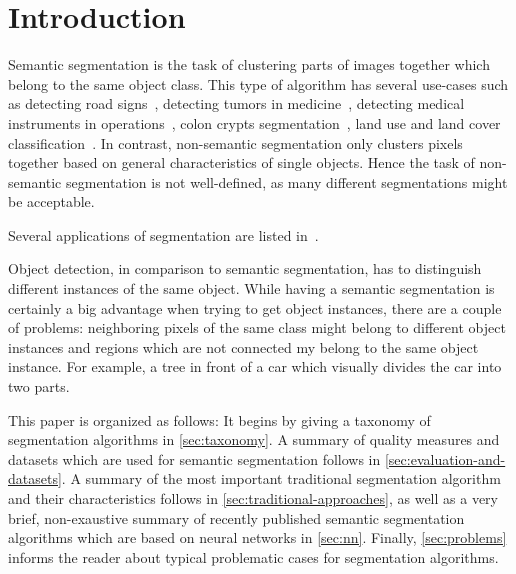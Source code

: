 
\section{Introduction}\label{sec:introduction}
Semantic segmentation is the task of clustering parts of images together which
belong to the same object class. This type of algorithm has several use-cases
such as detecting road signs~\cite{4220659}, detecting tumors in
medicine~\cite{moon2002automatic}, detecting medical instruments in
operations~\cite{wei1997automatic}, colon crypts
segmentation~\cite{cohen2015memory}, land use and land cover
classification~\cite{huang2002assessment}. In contrast, non-semantic
segmentation only clusters pixels together based on general characteristics of
single objects. Hence the task of non-semantic segmentation is not
well-defined, as many different segmentations might be acceptable.

Several applications of segmentation are listed
in~\cite{annurev.bioeng.2.1.315}.

Object detection, in comparison to semantic segmentation, has to distinguish
different instances of the same object. While having a semantic segmentation is
certainly a big advantage when trying to get object instances, there are a
couple of problems: neighboring pixels of the same class might belong to
different object instances and regions which are not connected my belong to the
same object instance. For example, a tree in front of a car which visually
divides the car into two parts.

This paper is organized as follows: It begins by giving a taxonomy of
segmentation algorithms in \cref{sec:taxonomy}. A summary of quality measures
and datasets which are used for semantic segmentation follows in
\cref{sec:evaluation-and-datasets}. A summary of the most important traditional
segmentation algorithm and their characteristics follows in
\cref{sec:traditional-approaches}, as well as a very brief, non-exaustive
summary of recently published semantic segmentation algorithms which are based
on neural networks in \cref{sec:nn}. Finally, \cref{sec:problems} informs the
reader about typical problematic cases for segmentation algorithms.

